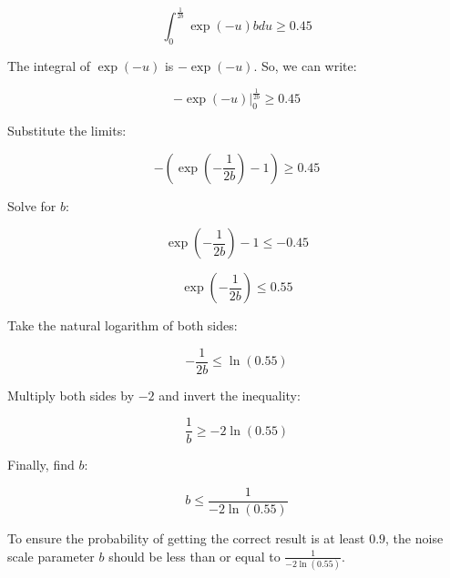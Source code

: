   \begin{equation}
    \int_0^{\frac{1}{2b}} \exp(-u) bdu \geq 0.45
  \end{equation}

  The integral of $\exp(-u)$ is $- \exp(-u)$. So, we can write:

  \begin{equation}
    -\exp(-u) \Big|_0^{\frac{1}{2b}} \geq 0.45
  \end{equation}

  Substitute the limits:

  \begin{equation}
    -(\exp(-\frac{1}{2b}) - 1) \geq 0.45
  \end{equation}

  Solve for $b$:

  \begin{equation}
    \exp(-\frac{1}{2b}) - 1 \leq -0.45
  \end{equation}

  \begin{equation}
    \exp(-\frac{1}{2b}) \leq 0.55
  \end{equation}

  Take the natural logarithm of both sides:

  \begin{equation}
    -\frac{1}{2b} \leq \ln(0.55)
  \end{equation}

  Multiply both sides by $-2$ and invert the inequality:


    \begin{equation}
      \frac{1}{b} \geq -2\ln(0.55)
    \end{equation}

  Finally, find $b$:

    \begin{equation}
      b \leq \frac{1}{-2\ln(0.55)}
    \end{equation}

  To ensure the probability of getting the correct result is at least $0.9$, the noise scale parameter $b$ should be less than or equal to $\frac{1}{-2\ln(0.55)}$.
